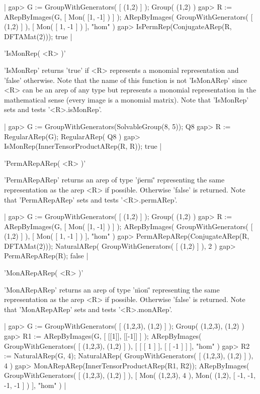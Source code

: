 |    gap> G := GroupWithGenerators( [ (1,2) ] );
    Group( (1,2) )
    gap> R := ARepByImages(G, [ Mon( [1, -1] ) ] );
    ARepByImages(
      GroupWithGenerators( [ (1,2) ] ),
      [ Mon( [ 1, -1 ] )
      ],
      "hom"
    )
    gap> IsPermRep(ConjugateARep(R, DFTAMat(2)));
    true |


'IsMonRep( <R> )'

'IsMonRep' returns 'true' if <R> represents a monomial
representation and 'false' otherwise. Note that the name of 
this function is not 'IsMonARep' since <R> can be an arep 
of any type but represents a monomial representation in 
the mathematical sense (every image is a monomial matrix).
Note that 'IsMonRep' sets and tests '<R>.isMonRep'.

|    gap> G := GroupWithGenerators(SolvableGroup(8, 5));
    Q8
    gap> R := RegularARep(G);
    RegularARep( Q8 )
    gap> IsMonRep(InnerTensorProductARep(R, R));
    true |


'PermARepARep( <R> )'

'PermARepARep' returns an arep of type '\"perm\"' representing 
the same representation as the arep <R> if possible. Otherwise
'false' is returned.
Note that 'PermARepARep' sets and tests '<R>.permARep'.

|    gap> G := GroupWithGenerators( [ (1,2) ] );        
    Group( (1,2) )
    gap> R := ARepByImages(G, [ Mon( [1, -1] ) ] );
    ARepByImages(
      GroupWithGenerators( [ (1,2) ] ),
      [ Mon( [ 1, -1 ] )
      ],
      "hom"
    )
    gap> PermARepARep(ConjugateARep(R, DFTAMat(2)));
    NaturalARep( GroupWithGenerators( [ (1,2) ] ), 2 ) 
    gap> PermARepARep(R);
    false |


'MonARepARep( <R> )'

'MonARepARep' returns an arep of type '\"mon\"' representing 
the same representation as the arep <R> if possible. Otherwise
'false' is returned.
Note that 'MonARepARep' sets and tests '<R>.monARep'.

|    gap> G := GroupWithGenerators( [ (1,2,3), (1,2) ] );
    Group( (1,2,3), (1,2) )
    gap> R1 := ARepByImages(G, [ [[1]], [[-1]] ] );
    ARepByImages(
      GroupWithGenerators( [ (1,2,3), (1,2) ] ),
      [ [ [ 1 ] ],
        [ [ -1 ] ]
      ],
      "hom"
    )
    gap> R2 := NaturalARep(G, 4);
    NaturalARep( GroupWithGenerators( [ (1,2,3), (1,2) ] ), 4 )
    gap> MonARepARep(InnerTensorProductARep(R1, R2));
    ARepByImages(
      GroupWithGenerators( [ (1,2,3), (1,2) ] ),
      [ Mon( (1,2,3), 4 ),
        Mon(
          (1,2),
          [ -1, -1, -1, -1 ]
        )
      ],
      "hom"
    ) |


